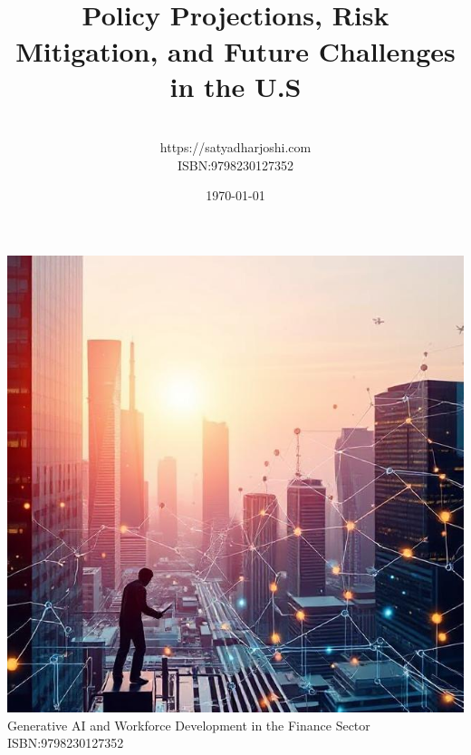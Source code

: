 \documentclass[a4paper,headinclude=on,footinclude=on,12pt,oneside]{scrbook}
\begin{document}
\clearpage  %
\thispagestyle{empty}  %
\begin{center}
	\includegraphics[width=\textwidth, height=\textheight, keepaspectratio]{images/wf}
	Generative AI and Workforce Development in the Finance Sector
	ISBN:9798230127352
	
\end{center}

\clearpage  %


\title{\\\small{Policy Projections, Risk Mitigation, and Future Challenges in the U.S}}
\author{
    \\https://satyadharjoshi.com\\ISBN:9798230127352
}
\date{\today}

\maketitle
\tableofcontents

\listoffigures
{}
\end{document}
